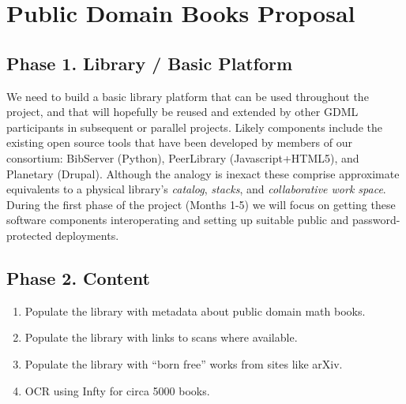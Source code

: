 \documentclass{article}
\begin{document}
\section*{Public Domain Books Proposal}

\subsection*{Phase 1. Library / Basic Platform}

We need to build a basic library platform that can be used throughout
the project, and that will hopefully be reused and extended by other
GDML participants in subsequent or parallel projects.  Likely
components include the existing open source tools that have been
developed by members of our consortium: BibServer (Python),
PeerLibrary (Javascript+HTML5), and Planetary (Drupal).  Although the
analogy is inexact these comprise approximate equivalents to a
physical library's \emph{catalog}, \emph{stacks}, and
\emph{collaborative work space}.
%
During the first phase of the project (Months 1-5) we will focus on
getting these software components interoperating and setting up
suitable public and password-protected deployments.

\subsection*{Phase 2. Content}

\begin{enumerate}[label=(\Alph*),itemsep=-5pt]
\item Populate the library with metadata about public domain math books.
\item Populate the library with links to scans where available.
\item Populate the library with ``born free'' works from sites like arXiv.
\item OCR using Infty for circa 5000 books.
\end{enumerate}
\end{document}
